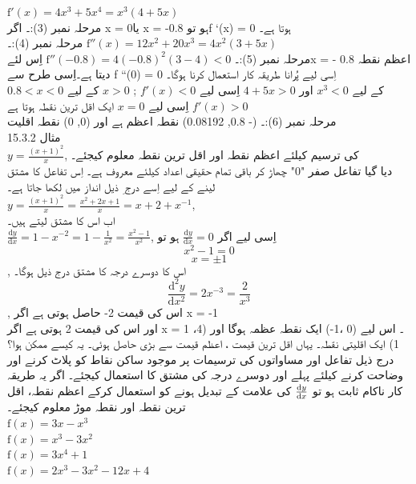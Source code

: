 \( \text{f}'(x) = 4x^{3} + 5x^{4} = x^{3}(4 + 5x) \)\\
مرحلہ نمبر (3):۔ اگر  x = 0یا x = -0.8 ہو توf `(x) = 0  ہوتا ہے۔ \\
مرحلہ نمبر (4):۔ 
\( \text{f}''(x) = 12x^{2} + 20x^{3} = 4x^{2}(3 + 5x) \)\\
مرحلہ نمبر (5):۔
\( \text{f}''(-0.8) = 4(-0.8)^2(3 - 4) < 0 \)
 اِس لئےx = - 0.8  اعظم نقطہ دیتا ہے۔اِسی طرح سے  f ``(0) = 0  اِسی لیے پُرانا طریقہ کار استعمال کرنا ہوگا۔\\
 \(0.8<x<0\)
  کے لیے
\(x^{3}<0\)
اور
\(4+5x>0\)
اِسی لیے
\(f'(x)<0\)
;
\(x>0\)
  کے لیے
  \(f'(x)>0\)
اِسی لیے
\(x=0\)
  ایک اقل ترین نقطہ ہوتا ہے\\
مرحلہ نمبر (6):۔ (- 0.8, 0.08192)  نقطہ اعظم  ہے  اور (0, 0)  نقطہ اقلیت \\
15.3.2 مثال\\
\( y = \frac{(x+1)^2}{x} \),
  کی ترسیم کیلئے اعظم نقطہ اور اقل ترین نقطہ معلوم کیجئے۔\\
دیا گیا تفاعل صفر "0" چھاڑ کر باقی تمام حقیقی اعداد کیلئے معروف  ہے۔ 
اِس تفاعل کا مشتق لینے کے لیے اِسے درج  ِ ذیل انداز میں لکھا جاتا ہے۔\\
 \( y = \frac{(x+1)^2}{x} = \frac{x^{2} + 2x +1}{x} = x + 2 + x^{-1}\),\\
اب اس کا مشتق لیتے ہیں۔\\
 \( \frac{\text{d}y}{\text{d}x} = 1 - x^{-2} = 1 - \frac{1}{x^2} = \frac{x^2 - 1}{x^2} \),
اِسی لیے اگر
\( \frac{\text{d}y}{\text{d}x} = 0 \)
  ہو تو \\
\[ x^2 - 1 = 0\] 
\[x = \pm1 \], 
اس کا دوسرے درجہ کا مشتق درج  ذیل ہوگا۔\\
\[\frac{\text{d}^2y}{\text{d}x^2} = 2x^{-3} = \frac{2}{x^3} \],
اس کی قیمت 2- حاصل ہوتی ہے اگر x = -1	\\
اور اس کی قیمت 2 ہوتی ہے اگر x = 1 ۔ اس لیے (0 ،1-) ایک نقطہ عظمہ ہوگا  اور (4، 1) ایک اقلیتی نقطہ۔ 
یہاں اقل ترین قیمت ، اعظم قیمت سے بڑی حاصل ہوئی۔ یہ کیسے ممکن ہوا؟\\
درج ذیل تفاعل اور مساواتوں کی ترسیمات پر موجود ساکن نقاط  کو پلاٹ کرنے اور وضاحت کرنے کیلئے پہلے اور دوسرے درجہ کی مشتق کا استعمال کیجئے۔ اگر یہ طریقہ کار ناکام ثابت ہو تو
\(\frac{\dif{y}}{\dif{x}}\)
 کی علامت کے تبدیل ہونے کو استعمال کرکے اعظم نقطہ، اقل ترین نقطہ اور نقطہ موڑ معلوم کیجئے۔ \\
 \( \text{f}(x) = 3x - x^3 \)\\
\( \text{f}(x) = x^3 - 3x^2 \)\\
\( \text{f}(x) = 3x^4 + 1 \)\\
\( \text{f}(x) = 2x^3 - 3x^2 - 12x + 4 \)\\
